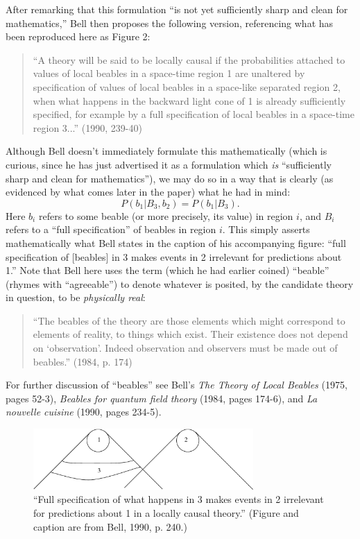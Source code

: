 \documentclass[aps,prc,twocolumn]{revtex4}
\begin{document}
After remarking that this formulation ``is not yet sufficiently sharp
and clean for mathematics,'' Bell then proposes the following 
version, referencing what has been reproduced here as Figure 2:
\begin{quote}
``A theory will be said to be locally causal if the probabilities
attached to values of local beables in a space-time region 1 are
unaltered by specification of values of local beables in a space-like
separated region 2, when what happens in the backward light cone of 1
is already sufficiently specified, for example by a full specification
of local beables in a space-time region 3...'' (1990, 239-40)
\end{quote}
Although Bell doesn't immediately formulate this mathematically (which
is curious, since he has just advertised it as a formulation which
\emph{is} ``sufficiently sharp and clean for mathematics''), we may do
so in a way that is clearly (as evidenced by what comes later in the
paper) what he had in mind:
\begin{equation}
P(b_1 | B_3, b_2) = P(b_1 | B_3).
\label{eq:loc}
\end{equation}
Here $b_i$ refers to some beable (or more precisely, its value) 
in region $i$, and $B_i$ refers to a
``full specification'' of beables in region $i$.  This simply asserts 
mathematically what Bell states in the caption of his
accompanying figure:  ``full specification of [beables] in 3 makes 
events in 2 irrelevant for predictions about 1.''  
Note that Bell here uses the term (which he had earlier coined)
``beable'' (rhymes with ``agreeable'')
to denote whatever is posited, by the candidate theory in question, 
to be \emph{physically real}:  
\begin{quote}
``The beables of the theory are those elements which might
correspond to elements of reality, to things which exist.  Their 
existence does not depend on `observation'.  Indeed observation
and observers must be made out of beables.'' (1984, p. 174)
\end{quote}
For further discussion of ``beables'' see Bell's \emph{The Theory of
  Local Beables} (1975, pages 52-3), \emph{Beables for quantum field
  theory} (1984, pages 174-6), and \emph{La nouvelle cuisine} (1990,
  pages 234-5).  



\begin{figure}[t]
\begin{center}
\includegraphics[width=3.3in,clip]{./fig2.eps}
\end{center}
\caption{
\label{fig2}
``Full specification of what happens in 3 makes events in 2 irrelevant
for predictions about 1 in a locally causal theory.''  
(Figure and caption are from Bell, 1990, p. 240.)
}
\end{figure}
\end{document}
